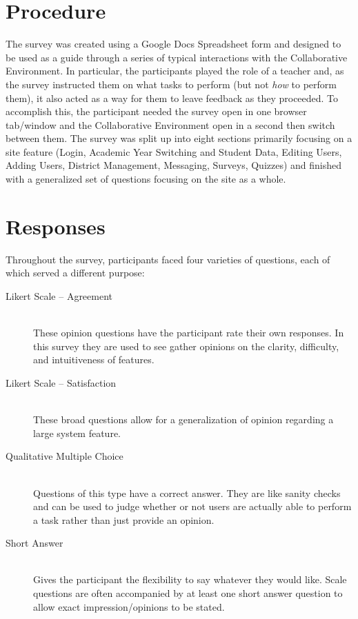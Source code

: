 \section{Procedure}
The survey was created using a Google Docs Spreadsheet form and designed to be used as a guide through a series of typical interactions with the Collaborative Environment. In particular, the participants played the role of a teacher and, as the survey instructed them on what tasks to perform (but not \emph{how} to perform them), it also acted as a way for them to leave feedback as they proceeded. To accomplish this, the participant needed the survey open in one browser tab/window and the Collaborative Environment open in a second then switch between them. The survey was split up into eight sections primarily focusing on a site feature (Login, Academic Year Switching and Student Data, Editing Users, Adding Users, District Management, Messaging, Surveys, Quizzes) and finished with a generalized set of questions focusing on the site as a whole.

\section{Responses}
Throughout the survey, participants faced four varieties of questions, each of which served a different purpose:

\begin{description}
	\item [Likert Scale -- Agreement] \hfill \\ These opinion questions have the participant rate their own responses. In this survey they are used to see gather opinions on the clarity, difficulty, and intuitiveness of features.
	\item [Likert Scale -- Satisfaction] \hfill \\ These broad questions allow for a generalization of opinion regarding a large system feature.
	\item [Qualitative Multiple Choice] \hfill \\ Questions of this type have a correct answer. They are like sanity checks and can be used to judge whether or not users are actually able to perform a task rather than just provide an opinion.
	\item [Short Answer] \hfill \\ Gives the participant the flexibility to say whatever they would like. Scale questions are often accompanied by at least one short answer question to allow exact impression/opinions to be stated.
\end{description}

